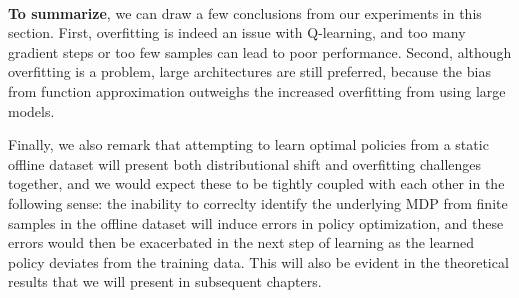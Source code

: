 ~

\textbf{To summarize}, we can draw a few conclusions from our experiments in this section. First, overfitting is indeed an issue with Q-learning, and too many gradient steps or too few samples can lead to poor performance. Second, although overfitting is a problem, large architectures are still preferred, because the bias from function approximation outweighs the increased overfitting from using large models. 

Finally, we also remark that attempting to learn optimal policies from a static offline dataset will present both distributional shift and overfitting challenges together, and we would expect these to be tightly coupled with each other in the following sense: the inability to correclty identify the underlying MDP from finite samples in the offline dataset will induce errors in policy optimization, and these errors would then be exacerbated in the next step of learning as the learned policy deviates from the training data. This will also be evident in the theoretical results that we will present in subsequent chapters.    